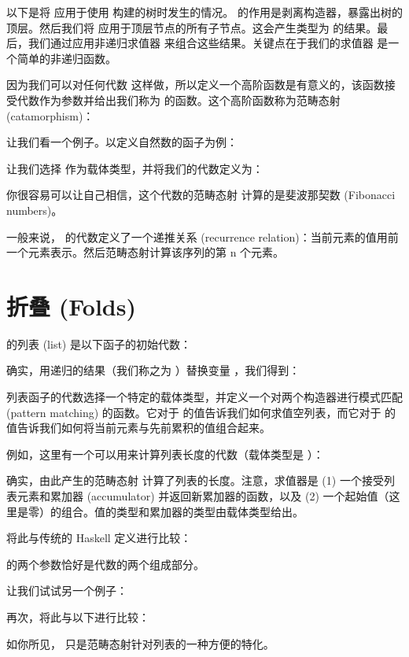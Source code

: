 以下是将  应用于使用  构建的树时发生的情况。 的作用是剥离构造器，暴露出树的顶层。然后我们将  应用于顶层节点的所有子节点。这会产生类型为  的结果。最后，我们通过应用非递归求值器  来组合这些结果。关键点在于我们的求值器  是一个简单的非递归函数。

因为我们可以对任何代数  这样做，所以定义一个高阶函数是有意义的，该函数接受代数作为参数并给出我们称为  的函数。这个高阶函数称为范畴态射 (catamorphism)：

让我们看一个例子。以定义自然数的函子为例：

让我们选择  作为载体类型，并将我们的代数定义为：

你很容易可以让自己相信，这个代数的范畴态射  计算的是斐波那契数 (Fibonacci numbers)。

一般来说， 的代数定义了一个递推关系 (recurrence relation)：当前元素的值用前一个元素表示。然后范畴态射计算该序列的第 n 个元素。

\section{折叠 (Folds)}

 的列表 (list) 是以下函子的初始代数：

确实，用递归的结果（我们称之为 ）替换变量 ，我们得到：

列表函子的代数选择一个特定的载体类型，并定义一个对两个构造器进行模式匹配 (pattern matching) 的函数。它对于  的值告诉我们如何求值空列表，而它对于  的值告诉我们如何将当前元素与先前累积的值组合起来。

例如，这里有一个可以用来计算列表长度的代数（载体类型是 ）：

确实，由此产生的范畴态射  计算了列表的长度。注意，求值器是 (1) 一个接受列表元素和累加器 (accumulator) 并返回新累加器的函数，以及 (2) 一个起始值（这里是零）的组合。值的类型和累加器的类型由载体类型给出。

将此与传统的 Haskell 定义进行比较：

 的两个参数恰好是代数的两个组成部分。

让我们试试另一个例子：

再次，将此与以下进行比较：

如你所见， 只是范畴态射针对列表的一种方便的特化。


